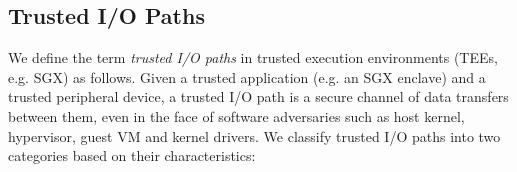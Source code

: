 \subsection{Trusted I/O Paths}\label{types}

We define the term \emph{trusted I/O paths} in trusted execution environments (TEEs, e.g. SGX) as follows. Given a trusted application (e.g. an SGX enclave) and a trusted peripheral device, a trusted I/O path is a secure channel of data transfers between them, even in the face of software adversaries such as host kernel, hypervisor, guest VM and kernel drivers. We classify trusted I/O paths into two categories based on their characteristics:

